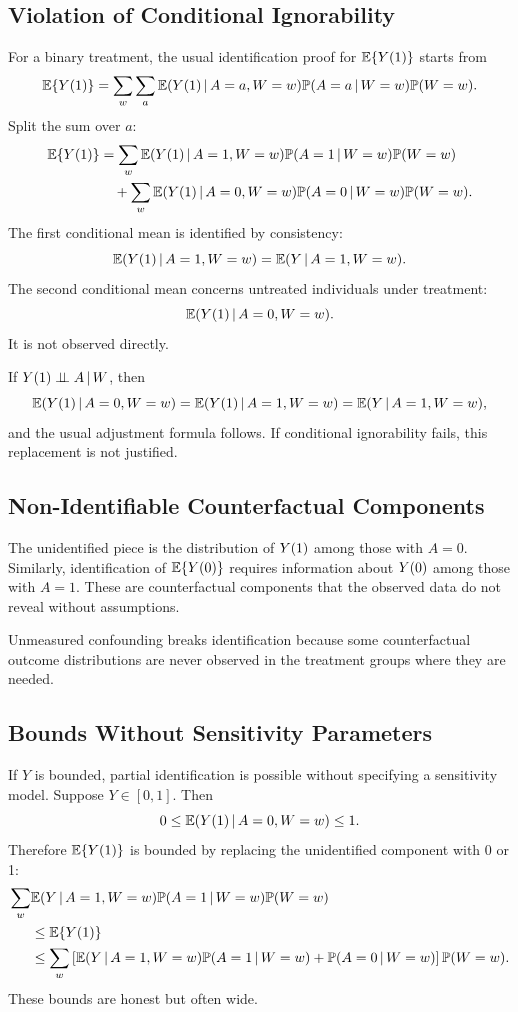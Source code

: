 \label{lec:9-4}

\subsection{Violation of Conditional Ignorability}

For a binary treatment, the usual identification proof for $\mathbb{E}\{Y(1)\}$ starts
from
\[
  \mathbb{E}\{Y(1)\}
  =
  \sum_w\sum_a
  \mathbb{E}(Y(1)\,\vert\, A=a,W=w)\mathbb{P}(A=a\,\vert\, W=w)\mathbb{P}(W=w).
\]
Split the sum over $a$:
\[
\begin{aligned}
  \mathbb{E}\{Y(1)\}
  &=
  \sum_w \mathbb{E}(Y(1)\,\vert\, A=1,W=w)\mathbb{P}(A=1\,\vert\, W=w)\mathbb{P}(W=w)\\
  &\quad+
  \sum_w \mathbb{E}(Y(1)\,\vert\, A=0,W=w)\mathbb{P}(A=0\,\vert\, W=w)\mathbb{P}(W=w).
\end{aligned}
\]
The first conditional mean is identified by consistency:
\[
  \mathbb{E}(Y(1)\,\vert\, A=1,W=w)=\mathbb{E}(Y\,\vert\, A=1,W=w).
\]
The second conditional mean concerns untreated individuals under treatment:
\[
  \mathbb{E}(Y(1)\,\vert\, A=0,W=w).
\]
It is not observed directly.

If $Y(1)\perp\!\!\!\perp A\,\vert\, W$, then
\[
  \mathbb{E}(Y(1)\,\vert\, A=0,W=w)
  =
  \mathbb{E}(Y(1)\,\vert\, A=1,W=w)
  =
  \mathbb{E}(Y\,\vert\, A=1,W=w),
\]
and the usual adjustment formula follows. If conditional ignorability fails,
this replacement is not justified.

\subsection{Non-Identifiable Counterfactual Components}

The unidentified piece is the distribution of $Y(1)$ among those with $A=0$.
Similarly, identification of $\mathbb{E}\{Y(0)\}$ requires information about $Y(0)$
among those with $A=1$. These are counterfactual components that the observed
data do not reveal without assumptions.

\begin{keyidea}
Unmeasured confounding breaks identification because some counterfactual
outcome distributions are never observed in the treatment groups where they are
needed.
\end{keyidea}

\subsection{Bounds Without Sensitivity Parameters}

If $Y$ is bounded, partial identification is possible without specifying a
sensitivity model. Suppose $Y\in[0,1]$. Then
\[
  0\le \mathbb{E}(Y(1)\,\vert\, A=0,W=w)\le 1.
\]
Therefore $\mathbb{E}\{Y(1)\}$ is bounded by replacing the unidentified component with
0 or 1:
\[
\begin{aligned}
  \sum_w &\mathbb{E}(Y\,\vert\, A=1,W=w)\mathbb{P}(A=1\,\vert\, W=w)\mathbb{P}(W=w)\\
  &\le \mathbb{E}\{Y(1)\}\\
  &\le
  \sum_w
  \left[
  \mathbb{E}(Y\,\vert\, A=1,W=w)\mathbb{P}(A=1\,\vert\, W=w)
  +\mathbb{P}(A=0\,\vert\, W=w)
  \right]\mathbb{P}(W=w).
\end{aligned}
\]
These bounds are honest but often wide.

